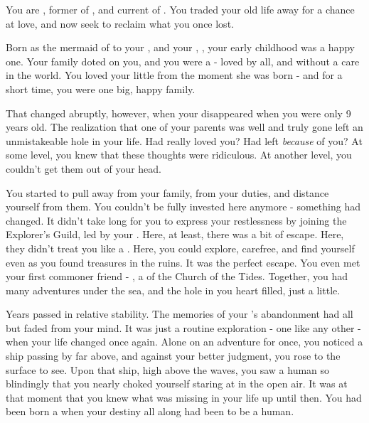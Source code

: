 \documentclass[char]{NeptuneBall}
\begin{document}
\name{\cAriel{}}



You are \cAriel{}, former \cAriel{\Prince} of \pAtlantis{}, and current \cAriel{\Prince} of \pAmerica{}. You traded your old life away for a chance at love, and now seek to reclaim what you once lost.

Born as the mermaid \cAriel{\prince} of \pAtlantis{} to your \cKing{\parent}, \cKing{\King} \cKing{} and your \cQueen{\parent}, \cQueen{\King} \cQueen{}, your early childhood was a happy one. Your family doted on you, and you were a \cAriel{\prince} - loved by all, and without a care in the world. You loved your little \cPrincess{\sibling} \cPrincess{} from the moment she was born - and for a short time, you were one big, happy family.

That changed abruptly, however, when your \cQueen{\parent} disappeared when you were only 9 years old. The realization that one of your parents was well and truly gone left an unmistakeable hole in your life. Had \cQueen{\they} really loved you? Had \cQueen{\they} left \emph{because} of you? At some level, you knew that these thoughts were ridiculous. At another level, you couldn't get them out of your head.

You started to pull away from your family, from your duties, and distance yourself from them. You couldn't be fully invested here anymore - something had changed. It didn't take long for you to express your restlessness by joining the Explorer's Guild, led by your \cPlant{\Uncle} \cPlant{}. Here, at least, there was a bit of escape. Here, they didn't treat you like a \cAriel{\prince}. Here, you could explore, carefree, and find yourself even as you found treasures in the ruins. It was the perfect escape. You even met your first commoner friend - \cPriest{}, a \cPriest{\priest} of the Church of the Tides. Together, you had many adventures under the sea, and the hole in you heart filled, just a little.

Years passed in relative stability. The memories of your \cQueen{\parent}'s abandonment had all but faded from your mind. It was just a routine exploration - one like any other - when your life changed once again. Alone on an adventure for once, you noticed a ship passing by far above, and against your better judgment, you rose to the surface to see. Upon that ship, high above the waves, you saw a human so blindingly \cEric{\hot} that you nearly choked yourself staring at \cEric{\them} in the open air. It was at that moment that you knew what was missing in your life up until then. You had been born a \cAriel{\mer} when your destiny all along had been to be a human.
\end{document}
